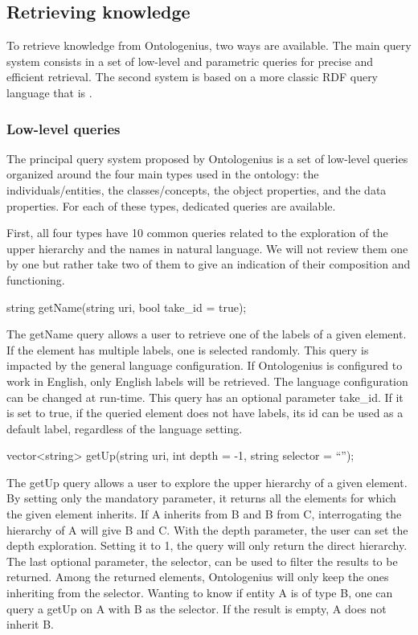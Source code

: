 \subsection{Retrieving knowledge}

To retrieve knowledge from Ontologenius, two ways are available. The main query system consists in a set of low-level and parametric queries for precise and efficient retrieval. The second system is based on a more classic RDF query language that is \sparql{}.

\subsubsection{Low-level queries}

The principal query system proposed by Ontologenius is a set of low-level queries organized around the four main types used in the ontology: the individuals/entities, the classes/concepts, the object properties, and the data properties. For each of these types, dedicated queries are available.

First, all four types have 10 common queries related to the exploration of the upper hierarchy and the names in natural language. We will not review them one by one but rather take two of them to give an indication of their composition and functioning. 

\begin{verbatimtab}
string getName(string uri, 
               bool take_id = true);
\end{verbatimtab}

The getName query allows a user to retrieve one of the labels of a given element. If the element has multiple labels, one is selected randomly. This query is impacted by the general language configuration. If Ontologenius is configured to work in English, only English labels will be retrieved. The language configuration can be changed at run-time. This query has an optional parameter take\_id. If it is set to true, if the queried element does not have labels, its id can be used as a default label, regardless of the language setting. 

\begin{verbatimtab}
vector<string> getUp(string uri,
                     int depth = -1, 
                     string selector = ``'');
\end{verbatimtab}

The getUp query allows a user to explore the upper hierarchy of a given element. By setting only the mandatory parameter, it returns all the elements for which the given element inherits. If A inherits from B and B from C, interrogating the hierarchy of A will give B and C. With the depth parameter, the user can set the depth exploration. Setting it to 1, the query will only return the direct hierarchy. The last optional parameter, the selector, can be used to filter the results to be returned. Among the returned elements, Ontologenius will only keep the ones inheriting from the selector. Wanting to know if entity A is of type B, one can query a getUp on A with B as the selector. If the result is empty, A does not inherit B.

